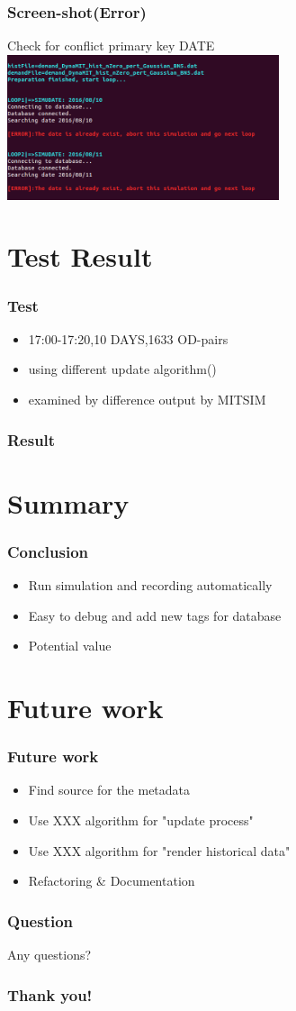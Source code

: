 \documentclass[12pt]{beamer}
\begin{document}
\begin{frame}
\frametitle{Screen-shot(Error)}
Check for conflict primary key DATE
\includegraphics[width = 0.6\textwidth]{screenshot_e.png}
\end{frame}

\section{Test Result}
\begin{frame}
\frametitle{Test}
\begin{itemize}
\item 17:00-17:20,10 DAYS,1633 OD-pairs
\item using different update algorithm()
\item examined by difference output by MITSIM
\end{itemize}
\end{frame}

\begin{frame}
\frametitle{Result}
\end{frame}

\section{Summary}
\begin{frame}
\frametitle{Conclusion}
\begin{itemize}
\item Run simulation and recording automatically
\item Easy to debug and add new tags for database
\item Potential value
\end{itemize}
\end{frame}

\section{Future work}
\begin{frame}
\frametitle{Future work}
\begin{itemize}
\item Find source for the metadata
\item Use XXX algorithm for "update process"
\item Use XXX algorithm for "render historical data"
\item Refactoring \& Documentation
\end{itemize}
\end{frame}
 
\begin{frame}
\frametitle{Question}
Any questions?
\end{frame}
 
 
\begin{frame}
\frametitle{Thank you!}
\end{frame}
\end{document}

